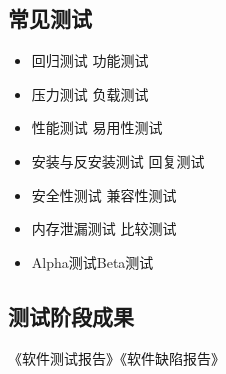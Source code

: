 \documentclass[UTF8,nofonts]{ctexart}
\begin{document}
\subsection{\textbf{常见测试}}
\begin{itemize}
 \setlength{\itemsep}{0pt}
 \setlength{\parskip}{0pt}
 \setlength{\parsep}{0pt}
\item 回归测试 功能测试
\item 压力测试 负载测试
\item	性能测试 易用性测试
\item	安装与反安装测试 回复测试
\item	安全性测试 兼容性测试
\item	内存泄漏测试 比较测试
\item	Alpha测试Beta测试
\end{itemize}
\subsection{\textbf{测试阶段成果}}
《软件测试报告》《软件缺陷报告》
\end{document}

